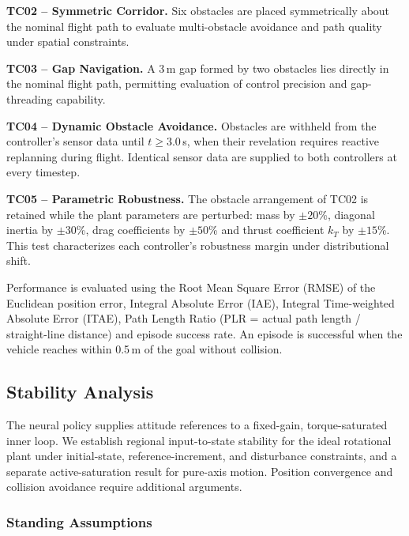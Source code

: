 \documentclass[12pt, a4paper]{article}
\begin{document}
\textbf{TC02 -- Symmetric Corridor.} Six obstacles are placed symmetrically about the nominal flight path to evaluate multi-obstacle avoidance and path quality under spatial constraints.

\textbf{TC03 -- Gap Navigation.} A 3\,m gap formed by two obstacles lies directly in the nominal flight path, permitting evaluation of control precision and gap-threading capability.

\textbf{TC04 -- Dynamic Obstacle Avoidance.} Obstacles are withheld from the controller's sensor data until $t \geq 3.0$\,s, when their revelation requires reactive replanning during flight.
Identical sensor data are supplied to both controllers at every timestep.

\textbf{TC05 -- Parametric Robustness.} The obstacle arrangement of TC02 is retained while the plant parameters are perturbed: mass by $\pm 20$\%, diagonal inertia by $\pm 30$\%, drag coefficients by $\pm 50$\% and thrust coefficient $k_T$ by $\pm 15$\%.
This test characterizes each controller's robustness margin under distributional shift.

Performance is evaluated using the Root Mean Square Error (RMSE) of the Euclidean position error, Integral Absolute Error (IAE), Integral Time-weighted Absolute Error (ITAE), Path Length Ratio (PLR = actual path length / straight-line distance) and episode success rate.
An episode is successful when the vehicle reaches within 0.5\,m of the goal without collision.


\subsection{Stability Analysis}
\label{sec:stability}

The neural policy supplies attitude references to a fixed-gain, torque-saturated
inner loop. We establish regional input-to-state stability for the ideal
rotational plant under initial-state, reference-increment, and disturbance
constraints, and a separate active-saturation result for pure-axis motion.
Position convergence and collision avoidance require additional arguments.

\subsubsection{Standing Assumptions}
\label{uhrc:sec:model}
\end{document}

